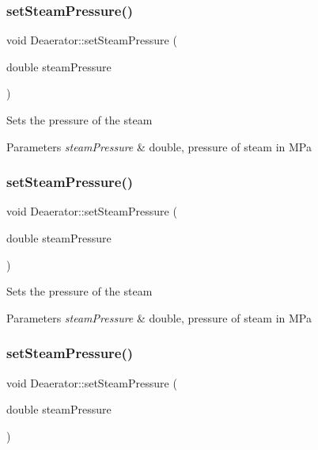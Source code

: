\subsubsection{\texorpdfstring{set\+Steam\+Pressure()}{setSteamPressure()}\hspace{0.1cm}{\footnotesize\ttfamily [1/3]}}
{\footnotesize\ttfamily void Deaerator\+::set\+Steam\+Pressure (\begin{DoxyParamCaption}\item[{double}]{steam\+Pressure }\end{DoxyParamCaption})}

Sets the pressure of the steam 
\begin{DoxyParams}{Parameters}
{\em steam\+Pressure} & double, pressure of steam in M\+Pa \\
\hline
\end{DoxyParams}
\mbox{\label{class_deaerator_a5936221e68b5ba3245f0adabed74e6d7}} 
\subsubsection{\texorpdfstring{set\+Steam\+Pressure()}{setSteamPressure()}\hspace{0.1cm}{\footnotesize\ttfamily [2/3]}}
{\footnotesize\ttfamily void Deaerator\+::set\+Steam\+Pressure (\begin{DoxyParamCaption}\item[{double}]{steam\+Pressure }\end{DoxyParamCaption})}

Sets the pressure of the steam 
\begin{DoxyParams}{Parameters}
{\em steam\+Pressure} & double, pressure of steam in M\+Pa \\
\hline
\end{DoxyParams}
\mbox{\label{class_deaerator_a5936221e68b5ba3245f0adabed74e6d7}} 
\subsubsection{\texorpdfstring{set\+Steam\+Pressure()}{setSteamPressure()}\hspace{0.1cm}{\footnotesize\ttfamily [3/3]}}
{\footnotesize\ttfamily void Deaerator\+::set\+Steam\+Pressure (\begin{DoxyParamCaption}\item[{double}]{steam\+Pressure }\end{DoxyParamCaption})}

